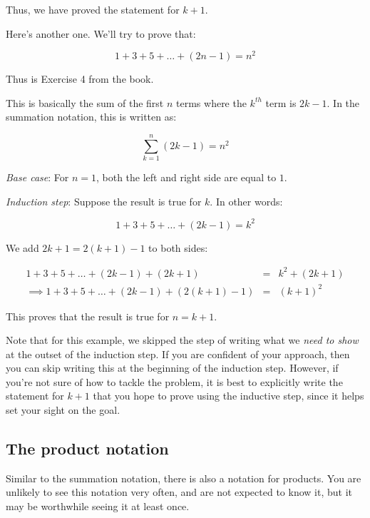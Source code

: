 \documentclass{amsart}
\begin{document}
Thus, we have proved the statement for $k + 1$.

Here's another one. We'll try to prove that:

\begin{equation*}
  1 + 3 + 5 + \dots + (2n - 1) = n^2
\end{equation*}

Thus is Exercise 4 from the book.

This is basically the sum of the first $n$ terms where the $k^{th}$
term is $2k - 1$. In the summation notation, this is written as:

\begin{equation*}
  \sum_{k=1}^n (2k - 1) = n^2
\end{equation*}

{\em Base case}: For $n = 1$, both the left and right side are equal
to $1$.

{\em Induction step}: Suppose the result is true for $k$. In other words:

\begin{equation*}
  1 + 3 + 5 + \dots + (2k - 1) = k^2 \tag{*}
\end{equation*}

We add $2k + 1 = 2(k+1) - 1$ to both sides:

\begin{eqnarray*}
  1 + 3 + 5 + \dots + (2k - 1) + (2k + 1) & = & k^2 + (2k + 1)\\
  \implies 1 + 3 + 5 + \dots + (2k - 1) + (2(k+1) - 1) & = & (k + 1)^2
\end{eqnarray*}

This proves that the result is true for $n = k + 1$.

Note that for this example, we skipped the step of writing what we
{\em need to show} at the outset of the induction step. If you are
confident of your approach, then you can skip writing this at the
beginning of the induction step. However, if you're not sure of how to
tackle the problem, it is best to explicitly write the statement for
$k + 1$ that you hope to prove using the inductive step, since it
helps set your sight on the goal.

\subsection{The product notation}

Similar to the summation notation, there is also a notation for
products. You are unlikely to see this notation very often, and are
not expected to know it, but it may be worthwhile seeing it at least
once.
\end{document}
